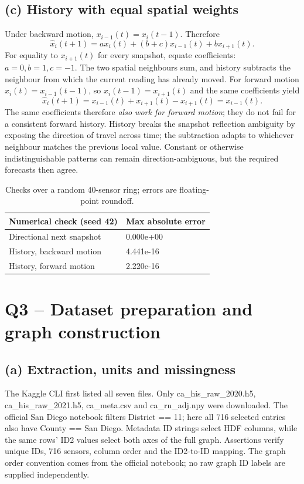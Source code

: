 \documentclass[11pt,a4paper]{article}
\begin{document}
\subsection{(c) History with equal spatial weights}
Under backward motion, $x_{i-1}(t)=x_i(t-1)$. Therefore
\[
\hat x_i(t+1)=a x_i(t)+(b+c)x_{i-1}(t)+b x_{i+1}(t).
\]
For equality to $x_{i+1}(t)$ for every snapshot, equate coefficients: $a=0,b=1,c=-1$. The two spatial neighbours sum, and history subtracts the neighbour from which the current reading has already moved.
For forward motion $x_i(t)=x_{i-1}(t-1)$, so $x_i(t-1)=x_{i+1}(t)$ and the same coefficients yield
\[
\hat x_i(t+1)=x_{i-1}(t)+x_{i+1}(t)-x_{i+1}(t)=x_{i-1}(t).
\]
The same coefficients therefore \emph{also work for forward motion}; they do not fail for a consistent forward history. History breaks the snapshot reflection ambiguity by exposing the direction of travel across time; the subtraction adapts to whichever neighbour matches the previous local value. Constant or otherwise indistinguishable patterns can remain direction-ambiguous, but the required forecasts then agree.
\begin{table}[htbp]\centering\small\caption{Checks over a random 40-sensor ring; errors are floating-point roundoff.}\begin{tabular}{ll}\toprule
Numerical check (seed 42) & Max absolute error\\\midrule
Directional next snapshot & 0.000e+00\\
History, backward motion & 4.441e-16\\
History, forward motion & 2.220e-16\\
\bottomrule\end{tabular}\end{table}
\section{Q3 -- Dataset preparation and graph construction}\subsection{(a) Extraction, units and missingness}
The Kaggle CLI first listed all seven files. Only ca\_his\_raw\_2020.h5, ca\_his\_raw\_2021.h5, ca\_meta.csv and ca\_rn\_adj.npy were downloaded. The official San Diego notebook filters District == 11; here all 716 selected entries also have County == San Diego. Metadata ID strings select HDF columns, while the same rows’ ID2 values select both axes of the full graph. Assertions verify unique IDs, 716 sensors, column order and the ID2-to-ID mapping. The graph order convention comes from the official notebook; no raw graph ID labels are supplied independently.
\end{document}
